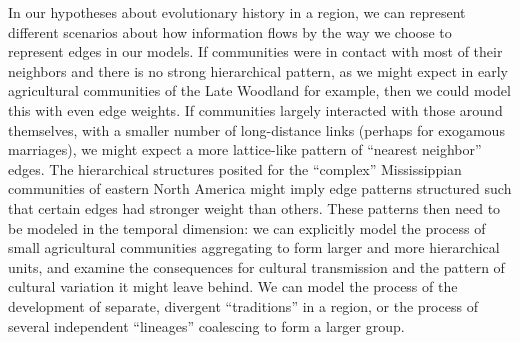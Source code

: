     In our hypotheses about evolutionary history in a region, we can represent different scenarios about how information flows by the way we choose to represent edges in our models.  If communities were in contact with most of their neighbors and there is no strong hierarchical pattern, as we might expect in early agricultural communities of the Late Woodland for example, then we could model this with even edge weights.  If communities largely interacted with those around themselves, with a smaller number of long-distance links (perhaps for exogamous marriages), we might expect a more lattice-like pattern of ``nearest neighbor'' edges.  The hierarchical structures posited for the ``complex'' Mississippian communities of eastern North America might imply edge patterns structured such that certain edges had stronger weight than others.  These patterns then need to be modeled in the temporal dimension:  we can explicitly model the process of small agricultural communities aggregating to form larger and more hierarchical units, and examine the consequences for cultural transmission and the pattern of cultural variation it might leave behind.  We can model the process of the development of separate, divergent ``traditions'' in a region, or the process of several independent ``lineages'' coalescing to form a larger group.   
    
